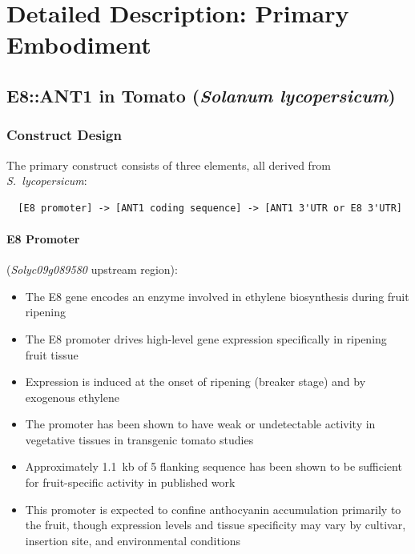 \documentclass[12pt,a4paper]{article}
\begin{document}
\section{Detailed Description: Primary Embodiment}
\label{sec:primary}

\subsection{E8::ANT1 in Tomato (\textit{Solanum lycopersicum})}

\subsubsection{Construct Design}

The primary construct consists of three elements, all derived from \textit{S.~lycopersicum}:

\begin{verbatim}
  [E8 promoter] -> [ANT1 coding sequence] -> [ANT1 3'UTR or E8 3'UTR]
\end{verbatim}

\paragraph{E8 Promoter} (\textit{Solyc09g089580} upstream region):
\begin{itemize}
  \item The E8 gene encodes an enzyme involved in ethylene biosynthesis during fruit ripening \citep{Deikman1988}
  \item The E8 promoter drives high-level gene expression specifically in ripening fruit tissue \citep{Butelli2008}
  \item Expression is induced at the onset of ripening (breaker stage) and by exogenous ethylene
  \item The promoter has been shown to have weak or undetectable activity in vegetative tissues in transgenic tomato studies \citep{Butelli2008}
  \item Approximately 1.1~kb of 5\textquotesingle{} flanking sequence has been shown to be sufficient for fruit-specific activity in published work
  \item This promoter is expected to confine anthocyanin accumulation primarily to the fruit, though expression levels and tissue specificity may vary by cultivar, insertion site, and environmental conditions
\end{itemize}
\end{document}
